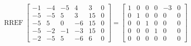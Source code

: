 \begin{exerciseAnswer} 


\[\operatorname{RREF} \left[\begin{array}{ccccc|c}
-1 & -4 & -5 & 4 & 3 & 0 \\
-5 & -5 & 5 & 3 & 15 & 0 \\
-5 & 5 & 0 & -6 & 15 & 0 \\
-5 & -2 & -1 & -3 & 15 & 0 \\
-2 & -5 & 5 & -6 & 6 & 0
\end{array}\right] = \left[\begin{array}{ccccc|c}
1 & 0 & 0 & 0 & -3 & 0 \\
0 & 1 & 0 & 0 & 0 & 0 \\
0 & 0 & 1 & 0 & 0 & 0 \\
0 & 0 & 0 & 1 & 0 & 0 \\
0 & 0 & 0 & 0 & 0 & 0
\end{array}\right] \]



\end{exerciseAnswer}
